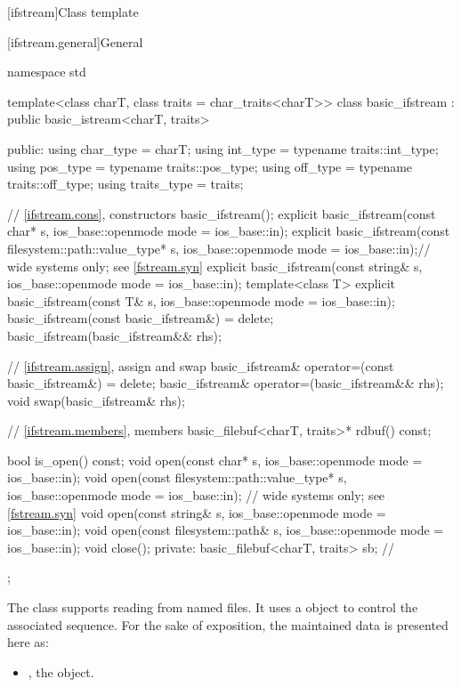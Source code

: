 [ifstream]{Class template }

[ifstream.general]{General}

%
\begin{codeblock}
namespace std {
  template<class charT, class traits = char_traits<charT>>
  class basic_ifstream : public basic_istream<charT, traits> {
  public:
    using char_type   = charT;
    using int_type    = typename traits::int_type;
    using pos_type    = typename traits::pos_type;
    using off_type    = typename traits::off_type;
    using traits_type = traits;

    // \ref{ifstream.cons}, constructors
    basic_ifstream();
    explicit basic_ifstream(const char* s,
                            ios_base::openmode mode = ios_base::in);
    explicit basic_ifstream(const filesystem::path::value_type* s,
                            ios_base::openmode mode = ios_base::in);// wide systems only; see \ref{fstream.syn}
    explicit basic_ifstream(const string& s,
                            ios_base::openmode mode = ios_base::in);
    template<class T>
      explicit basic_ifstream(const T& s, ios_base::openmode mode = ios_base::in);
    basic_ifstream(const basic_ifstream&) = delete;
    basic_ifstream(basic_ifstream&& rhs);

    // \ref{ifstream.assign}, assign and swap
    basic_ifstream& operator=(const basic_ifstream&) = delete;
    basic_ifstream& operator=(basic_ifstream&& rhs);
    void swap(basic_ifstream& rhs);

    // \ref{ifstream.members}, members
    basic_filebuf<charT, traits>* rdbuf() const;

    bool is_open() const;
    void open(const char* s, ios_base::openmode mode = ios_base::in);
    void open(const filesystem::path::value_type* s,
              ios_base::openmode mode = ios_base::in);  // wide systems only; see \ref{fstream.syn}
    void open(const string& s, ios_base::openmode mode = ios_base::in);
    void open(const filesystem::path& s, ios_base::openmode mode = ios_base::in);
    void close();
  private:
    basic_filebuf<charT, traits> sb;    // \expos
  };
}
\end{codeblock}

\pnum
The class
supports reading from named files.
It uses a
object to control the associated
sequence.
For the sake of exposition, the maintained data is presented here as:
\begin{itemize}
\item
{}, the  object.
\end{itemize}


